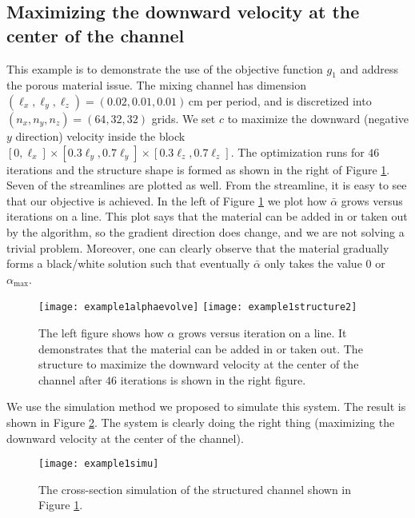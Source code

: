 \subsection{Maximizing the downward velocity at the center of the channel}
This example is to demonstrate the use of the objective function $g_1$
and address the porous material issue. The mixing channel has
dimension $(\ell_x,\ell_y,\ell_z) = (0.02,0.01,0.01)\,$cm per period, and is
discretized into $(n_x,n_y,n_z)=(64,32,32)$ grids. We set $c$ to
maximize the downward (negative $y$ direction) velocity inside the
block $[0,\ell_x]\times[0.3\ell_y,0.7\ell_y]\times[0.3\ell_z,0.7\ell_z ]$. The
optimization runs for $46$ iterations and the structure shape is
formed as shown in the right of Figure \ref{example1structure}. Seven
of the streamlines are plotted as well. From the streamline, it is
easy to see that our objective is achieved. In the left of Figure
\ref{example1structure} we plot how $\bar{\alpha}$ grows versus iterations on
a line. This plot says that the material can be added in or taken out
by the algorithm, so the gradient direction does change, and we are
not solving a trivial problem. Moreover, one can clearly observe that
the material gradually forms a black/white solution such that
eventually $\bar{\alpha}$ only takes the value $0$ or $\alpha_\text{max}$.


  \begin{figure}
    \centerline{
     \texttt{[image: example1alphaevolve]}
     \texttt{[image: example1structure2]}}
    \caption{\label{example1structure} The left figure shows how $\alpha$ grows versus iteration on a line. It demonstrates that the material can be added in or taken out. The structure to maximize the downward velocity at the center of the channel after $46$ iterations is shown in the right figure. }
  \end{figure}

We use the simulation method we proposed to simulate this
system. The result is shown in Figure \ref{example1simulation}. The
system is clearly doing the right thing (maximizing the downward
velocity at the center of the channel).

  \begin{figure}
    \centerline{
     \texttt{[image: example1simu]}
     }
    \caption{\label{example1simulation} The cross-section simulation of the structured channel shown in Figure \ref{example1structure}.}
  \end{figure}

